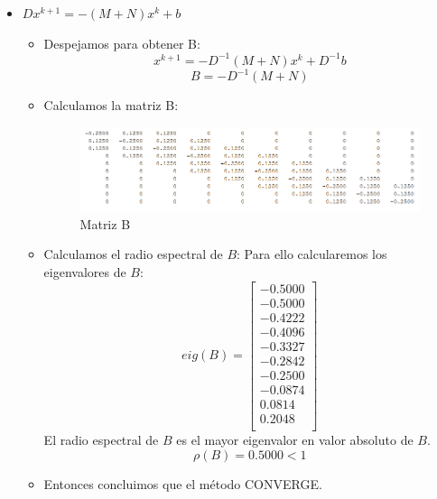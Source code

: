 \begin{itemize}
    \item $Dx^{k+1}=-(M+N)x^k + b$ 
    \begin{itemize}
        \item Despejamos para obtener B:
        $$x^{k+1}=-D^{-1}(M+N)x^k + D^{-1}b$$ 
        $$B=-D^{-1}(M+N)$$
    \item Calculamos la matriz B:
    \begin{figure}[H]
                \centering
                \includegraphics[width=1.1\textwidth]{matrix_images/b2.PNG}
                \caption{Matriz B}
        \end{figure}
    \item Calculamos el radio espectral de $B$:
     Para ello calcularemos los eigenvalores de $B$:
    $$eig(B)=\begin{bmatrix}
              -0.5000\\
           -0.5000\\
           -0.4222\\
           -0.4096\\
           -0.3327\\
           -0.2842\\
           -0.2500\\
           -0.0874\\
            0.0814\\
            0.2048\\
    \end{bmatrix}
    $$
    El radio espectral de $B$ es el mayor eigenvalor en valor absoluto de $B$.
    $$\rho (B) = 0.5000<1$$
    \item Entonces concluimos que el método CONVERGE.
    \end{itemize}
    
    
    

\end{itemize}
